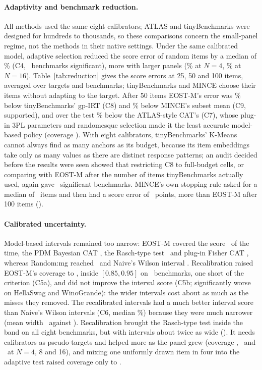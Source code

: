 \paragraph{Adaptivity and benchmark reduction.} All methods used the same eight calibrators;
ATLAS and tinyBenchmarks were designed for hundreds to thousands, so these comparisons concern
the small-panel regime, not the methods in their native settings. Under the same calibrated
model, adaptive selection reduced the score error of random items by a median of
\STwoCFourMed\% (C4, \STwoCFourFav\ benchmarks significant), more with larger panels
(\SecCFourNFourMed\% at $N=4$, \SecCFourNSixteenMed\% at $N=16$). Table~\ref{tab:reduction}
gives the score errors at 25, 50 and 100 items, averaged over targets and benchmarks;
tinyBenchmarks and MINCE choose their items without adapting to the target. After 50 items
EOST-M's error was \STwoCEightMed\% below tinyBenchmarks' gp-IRT (C8) and \STwoCNineMed\%
below MINCE's subset mean (C9, supported), and over the test \STwoCSevenMed\% below the
ATLAS-style CAT's (C7), whose plug-in 3PL parameters and randomesque selection made it the
least accurate model-based policy (coverage \STwoCovatlas). With eight calibrators,
tinyBenchmarks' K-Means cannot always find as many anchors as its budget, because its item
embeddings take only as many values as there are distinct response patterns; an audit
decided before the results were seen showed that restricting C8 to full-budget cells, or
comparing with EOST-M after the number of items tinyBenchmarks actually used, again gave
\TinyFullFav\ significant benchmarks. MINCE's own stopping rule asked for a median of
\STwoMinceNstarMed\ items and then had a score error of \STwoMinceErrNstar\ points, more
than EOST-M after 100 items (\STwoErreigmgHundred).



\paragraph{Calibrated uncertainty.} Model-based intervals remained too narrow: EOST-M
covered the score \STwoCoveigmg\ of the time, the PDM Bayesian CAT \FbBmiCov, the Rasch-type
test \STwoCovmfiOnepr\ and plug-in Fisher CAT \STwoCovmfipi, whereas Random:mg reached
\STwoCovrandommg\ and Naive's Wilson interval \STwoCovnaive. Recalibration raised EOST-M's
coverage to \STwoCoveigmgRR, inside $[0.85,0.95]$ on \STwoCFiveaIn\ benchmarks, one short of
the criterion (C5a), and did not improve the interval score (C5b; significantly worse on
HellaSwag and WinoGrande): the wider intervals cost about as much as the misses they removed.
The recalibrated intervals had a much better interval score than Naive's Wilson intervals
(C6, median \STwoCSixMed\%) because they were much narrower (mean width \STwoWidtheigmgRR\
against \STwoWidthnaive). Recalibration brought the Rasch-type test inside the band on all
eight benchmarks, but with intervals about twice as wide (\STwoWidthmfiOneprRR). It needs
calibrators as pseudo-targets and helped more as the panel grew (coverage
\STwoCovEostRNFour, \STwoCovEostRNEight\ and \STwoCovEostRNSixteen\ at $N=4$, 8 and 16), and
mixing one uniformly drawn item in four into the adaptive test raised coverage only to
\STwoCovmixmg.

